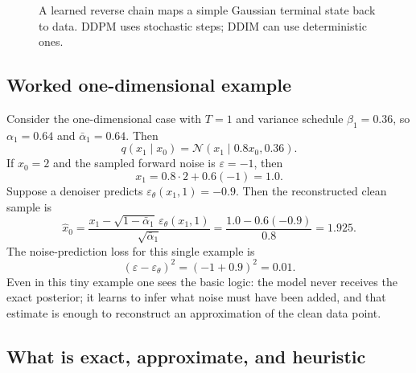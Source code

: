 \begin{figure}[h]
\centering
{}
\caption{A learned reverse chain maps a simple Gaussian terminal state back to data. DDPM uses stochastic steps; DDIM can use deterministic ones.}
\end{figure}

\subsection*{Worked one-dimensional example}

Consider the one-dimensional case with $T=1$ and variance schedule $\beta_1=0.36$, so $\alpha_1=0.64$ and $\bar\alpha_1=0.64$.
Then
\[
q(x_1\mid x_0)=\mathcal{N}(x_1\mid 0.8x_0,0.36).
\]
If $x_0=2$ and the sampled forward noise is $\varepsilon=-1$, then
\[
x_1 = 0.8\cdot 2 + 0.6(-1)=1.0.
\]
Suppose a denoiser predicts $\varepsilon_\theta(x_1,1)=-0.9$.
Then the reconstructed clean sample is
\[
\hat x_0
=
\frac{x_1-\sqrt{1-\bar\alpha_1}\,\varepsilon_\theta(x_1,1)}{\sqrt{\bar\alpha_1}}
=
\frac{1.0-0.6(-0.9)}{0.8}
=1.925.
\]
The noise-prediction loss for this single example is
\[
(\varepsilon-\varepsilon_\theta)^2 = (-1+0.9)^2 = 0.01.
\]
Even in this tiny example one sees the basic logic: the model never receives the exact posterior; it learns to infer what noise must have been added, and that estimate is enough to reconstruct an approximation of the clean data point.

\subsection*{What is exact, approximate, and heuristic}

